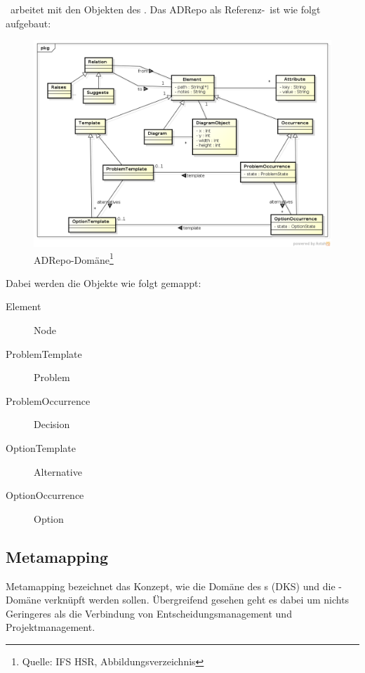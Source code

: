 			\eeppi\ arbeitet mit den Objekten des \dks. Das ADRepo als Referenz-\dks\ ist wie folgt aufgebaut:
			\begin{figure}[H]
				\includegraphics[width=\linewidth]{architecture/media/img/dksDomain.png}
				\centering
				\caption[ADRepo-Domäne\newline 
				]{ADRepo-Domäne\footnote{Quelle: IFS HSR, Abbildungsverzeichnis}}
				\label{fig:dksDomain}
			\end{figure}
			
			Dabei werden die Objekte wie folgt gemappt:
			\begin{description}
				\item[Element] Node
				\item[ProblemTemplate] Problem
				\item[ProblemOccurrence] Decision
				\item[OptionTemplate] Alternative
				\item[OptionOccurrence] Option
			\end{description}
			
			
		\subsection{Metamapping}
			Metamapping bezeichnet das Konzept, 
			wie die Domäne des \dks s (DKS) und die \eeppi -Domäne verknüpft werden sollen.
			Übergreifend gesehen geht es dabei um nichts Geringeres als die Verbindung von Entscheidungsmanagement und Projektmanagement.			
		
